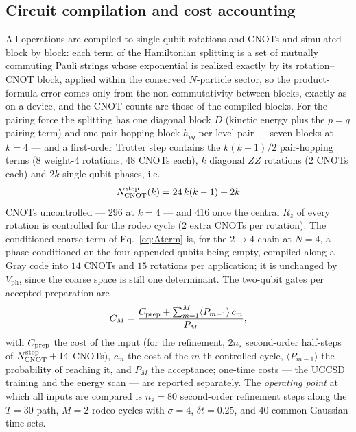 \documentclass[
  aps,            %
  prc,            %
  reprint,        %
  superscriptaddress,
  floatfix,
  nofootinbib
]{revtex4-2}
\newcommand{\Vph}{V_{\mathrm{ph}}}
\begin{document}
\subsection{Circuit compilation and cost accounting}
\label{sec:cost}
All operations are compiled to single-qubit rotations and CNOTs and
simulated block by block: each term of the Hamiltonian splitting is a set
of mutually commuting Pauli strings whose exponential is realized exactly by
its rotation--CNOT block, applied within the conserved $N$-particle sector,
so the product-formula error comes only from the non-commutativity between
blocks, exactly as on a device, and the CNOT counts are those of the
compiled blocks.  For the pairing force the splitting has one diagonal
block $D$ (kinetic energy plus the $p=q$ pairing term) and one pair-hopping
block $h_{pq}$ per level pair --- seven blocks at $k=4$ --- and a
first-order Trotter step contains the $k(k-1)/2$ pair-hopping terms ($8$
weight-$4$ rotations, $48$ CNOTs each), $k$ diagonal $ZZ$ rotations ($2$
CNOTs each) and $2k$ single-qubit phases, i.e.\
\begin{equation}
  N_{\rm CNOT}^{\rm step}(k)=24\,k(k-1)+2k
  \label{eq:trottercost}
\end{equation}
CNOTs uncontrolled --- $296$ at $k=4$ --- and $416$ once the central $R_z$ of
every rotation is controlled for the rodeo cycle ($2$ extra CNOTs per
rotation).  The conditioned coarse term of Eq.~\eqref{eq:Aterm} is, for the
$2\to4$ chain at $N=4$, a phase conditioned on the four appended qubits being
empty, compiled along a Gray code into $14$ CNOTs and $15$ rotations per
application; it is unchanged by $\Vph$, since the coarse space is still one
determinant.  The two-qubit gates per accepted preparation are
\begin{equation}
  C_M=\frac{C_{\rm prep}+\sum_{m=1}^{M}\langle P_{m-1}\rangle\,c_m}{P_M},
  \label{eq:cost}
\end{equation}
with $C_{\rm prep}$ the cost of the input (for the refinement, $2n_s$
second-order half-steps of $N_{\rm CNOT}^{\rm step}+14$ CNOTs), $c_m$ the
cost of the $m$-th controlled cycle, $\langle P_{m-1}\rangle$ the
probability of reaching it, and $P_M$ the acceptance; one-time costs --- the
UCCSD training and the energy scan --- are reported separately.  The
\emph{operating point} at which all inputs are compared is $n_s=80$
second-order refinement steps along the $T=30$ path, $M=2$ rodeo cycles with
$\sigma=4$, $\delta t=0.25$, and $40$ common Gaussian time sets.
\end{document}

